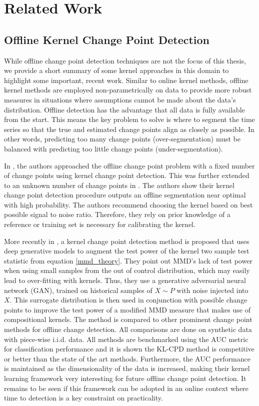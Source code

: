 \section{Related Work}
\label{related_works}

\subsection{Offline Kernel Change Point Detection}
While offline change point detection techniques are not the focus of this thesis, we provide a short summary of some kernel approaches in this domain to highlight some important, recent work.  Similar to online kernel methods, offline kernel methods are employed non-parametrically on data to provide more robust measures in situations where assumptions cannot be made about the data's distribution. Offline detection has the advantage that all data is fully available from the start. This means the key problem to solve is where to segment the time series so that the true and estimated change points align as closely as possible.  In other words, predicting too many change points (over-segmentation) must be balanced with predicting too little change points (under-segmentation). 

In \cite{harchaoui2007retrospective}, the authors approached the offline change point problem with a fixed number of change points using kernel change point detection. This was further extended to an unknown number of change points in \cite{arlot2012kernel}. The authors show their kernel change point detection procedure outputs an offline segmentation near optimal with high probability. The authors recommend choosing the kernel based on best possible signal to noise ratio. Therefore, they rely on prior knowledge of a reference or training set is necessary for calibrating the kernel. 

More recently in \cite{chang2019kernel}, a  kernel change point detection method is proposed that uses deep generative models to augment the test power of the kernel two sample test statistic from equation \ref{mmd_theory}. They point out MMD's lack of test power when using small samples from the out of control distribution, which may easily lead to over-fitting with kernels. Thus, they use a generative adversarial neural network (GAN), trained on historical samples of $X \sim  P$  with noise injected into $X$. This surrogate distribution is then used in conjunction with possible change points to improve the test power of a modified MMD measure that makes use of compositional kernels. The method is compared to other prominent change point methods for offline change detection. All comparisons are done on synthetic data with piece-wise i.i.d. data. All methods are benchmarked using the AUC metric for classification performance and it is shown the KL-CPD method is competitive or better than the state of the art methods.  Furthermore, the AUC performance is maintained as the dimensionality of the data is increased, making their kernel learning framework very interesting for future offline change point detection. It remains to be seen if this framework can be adopted in an online context where time to detection is a key constraint on practicality.

